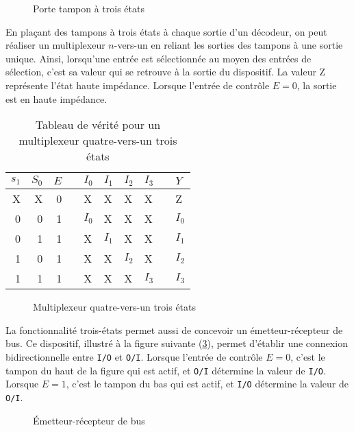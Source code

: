 \documentclass[11pt]{article}
\begin{document}
\begin{figure}[htbp]
\centering

\caption{\label{fig:orgc1d3862}Porte tampon à trois états}
\end{figure}

En plaçant des tampons à trois états à chaque sortie d'un décodeur, on
peut réaliser un multiplexeur \(n\)-vers-un en reliant les sorties des
tampons à une sortie unique. Ainsi, lorsqu'une entrée est
sélectionnée au moyen des entrées de sélection, c'est sa valeur qui se
retrouve à la sortie du dispositif. La valeur Z représente l'état
haute impédance.  Lorsque l'entrée de contrôle \(E = 0\), la sortie est
en haute impédance.

\begin{table}[htbp]
\caption{\label{tab:orgf693382}Tableau de vérité pour un  multiplexeur quatre-vers-un trois états}
\centering
\begin{tabular}{rrrlllllll}
\(s_1\) & \(S_0\) & \(E\) &  & \(I_0\) & \(I_1\) & \(I_2\) & \(I_3\) &  & \(Y\)\\[0pt]
\hline
X & X & 0 &  & X & X & X & X &  & Z\\[0pt]
0 & 0 & 1 &  & \(I_0\) & X & X & X &  & \(I_0\)\\[0pt]
0 & 1 & 1 &  & X & \(I_1\) & X & X &  & \(I_1\)\\[0pt]
1 & 0 & 1 &  & X & X & \(I_2\) & X &  & \(I_2\)\\[0pt]
1 & 1 & 1 &  & X & X & X & \(I_3\) &  & \(I_3\)\\[0pt]
\end{tabular}
\end{table}


\begin{figure}[htbp]
\centering

\caption{\label{fig:orge9202b5}Multiplexeur quatre-vers-un trois états}
\end{figure}

La fonctionnalité trois-états permet aussi de concevoir un
émetteur-récepteur de bus. Ce dispositif, illustré à la figure
suivante (\ref{fig:orgf5ee6d9}), permet d'établir une connexion
bidirectionnelle entre \texttt{I/O} et \texttt{O/I}. Lorsque l'entrée de contrôle
\(E = 0\), c'est le tampon du haut de la figure qui est actif, et
\texttt{O/I} détermine la valeur de \texttt{I/O}. Lorsque \(E = 1\), c'est le tampon
du bas qui est actif, et \texttt{I/O} détermine la valeur de \texttt{O/I}.

\begin{figure}[htbp]
\centering

\caption{\label{fig:orgf5ee6d9}Émetteur-récepteur de bus}
\end{figure}
\end{document}

